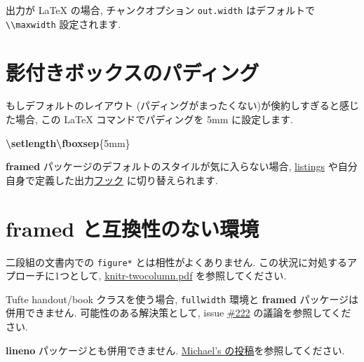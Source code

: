 \documentclass[
  lualatex,ja=standard,jafont=noto-otf]{bxjsreport}
\newenvironment{Shaded}{\begin{snugshade}}{\end{snugshade}}
\newcommand{\FunctionTok}[1]{\textcolor[rgb]{0.13,0.29,0.53}{\textbf{#1}}}
\newcommand{\NormalTok}[1]{#1}
\begin{document}
出力が LaTeX の場合, チャンクオプション \texttt{out.width}
はデフォルトで
\texttt{\textquotesingle{}\textbackslash{}\textbackslash{}maxwidth\textquotesingle{}}
設定されます.

\hypertarget{ux5f71ux4ed8ux304dux30dcux30c3ux30afux30b9ux306eux30d1ux30c7ux30a3ux30f3ux30b0}{%
\section*{影付きボックスのパディング}\label{ux5f71ux4ed8ux304dux30dcux30c3ux30afux30b9ux306eux30d1ux30c7ux30a3ux30f3ux30b0}}

もしデフォルトのレイアウト
(パディングがまったくない)が倹約しすぎると感じた場合, この LaTeX
コマンドでパディングを 5mm に設定します.

\begin{Shaded}
\begin{Highlighting}[]
\FunctionTok{\textbackslash{}setlength\textbackslash{}fboxsep}\NormalTok{\{5mm\}}
\end{Highlighting}
\end{Shaded}

\textbf{framed} パッケージのデフォルトのスタイルが気に入らない場合,
\protect\hyperlink{listings}{listings}
や自分自身で定義した出力\protect\hyperlink{hooks}{フック}
に切り替えられます.

\hypertarget{framed-ux3068ux4e92ux63dbux6027ux306eux306aux3044ux74b0ux5883}{%
\section*{\texorpdfstring{\textbf{framed}
と互換性のない環境}{framed と互換性のない環境}}\label{framed-ux3068ux4e92ux63dbux6027ux306eux306aux3044ux74b0ux5883}}

二段組の文書内での \texttt{figure*} とは相性がよくありません.
この状況に対処するアプローチに1つとして,
\href{https://github.com/yihui/knitr/releases/download/doc/knitr-twocolumn.pdf}{knitr-twocolumn.pdf}
を参照してください.

Tufte handout/book クラスを使う場合, \texttt{fullwidth} 環境と
\textbf{framed} パッケージは併用できません. 可能性のある解決策として,
issue \href{https://github.com/yihui/knitr/issues/222}{\#222}
の議論を参照してください.

\textbf{lineno} パッケージとも併用できません.
\href{http://groups.google.com/group/knitr/browse_thread/thread/b0d6723386371139}{Michael's
の投稿}を参照してください.
\end{document}
